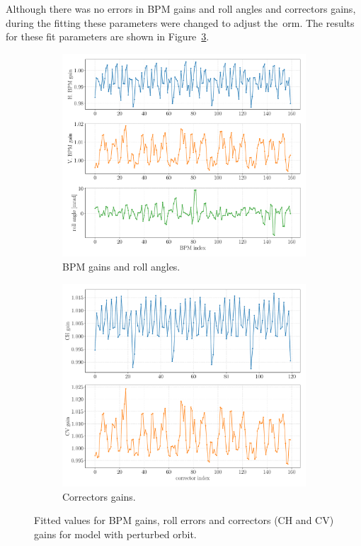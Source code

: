 Although there was no errors in BPM gains and roll angles and correctors gains, during the fitting these parameters were changed to adjust the~\gls{orm}. The results for these fit parameters are shown in Figure~\ref{fig:gain_fit_orb}.
\begin{figure}
\centering
\begin{subfigure}[t]{0.49\textwidth}
\includegraphics[width=1.0\textwidth]{figures/bpm_gains_orbit_distortion.pdf}
    \caption{BPM gains and roll angles.}
    \label{subfig:bpm_fit_orb}
\end{subfigure}
 \begin{subfigure}[t]{0.49\textwidth}
\includegraphics[width=1.0\textwidth]{figures/corr_gains_orbit_distortion.pdf}
    \caption{Correctors gains.}
    \label{subfig:corr_fit_orb}
\end{subfigure}
\caption{Fitted values for BPM gains, roll errors and correctors (CH and CV) gains for model with perturbed orbit.}
\label{fig:gain_fit_orb}
\end{figure}

